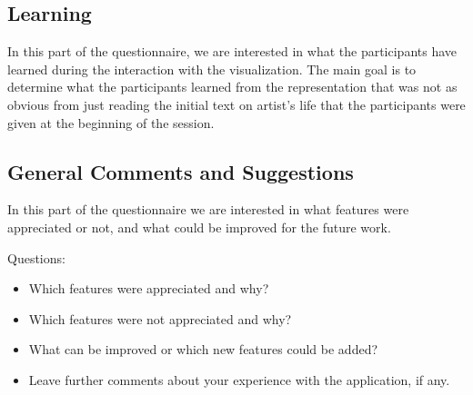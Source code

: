 \subsection{Learning}\label{subsec:questionnaire-learning}
In this part of the questionnaire, we are interested in what the participants have learned during the interaction with the visualization. The main
goal is to determine what the participants learned from the representation that was not as obvious from just reading the initial text on artist's
life that the participants were given at the beginning of the session.

\clearpage
\subsection{General Comments and Suggestions}\label{subsec:questionnaire-feedback}
In this part of the questionnaire we are interested in what features were appreciated or not, and what could be improved for the future work.

Questions:
\begin{itemize}
    \item Which features were appreciated and why?
    \item Which features were not appreciated and why?
    \item What can be improved or which new features could be added?
    \item Leave further comments about your experience with the application, if any.
\end{itemize}